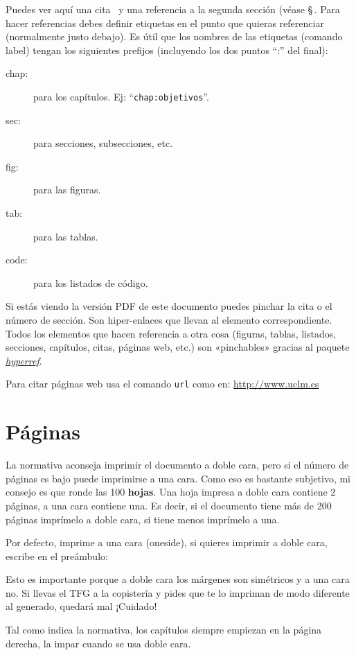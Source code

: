 Puedes ver aquí una cita~\cite{design_patterns} y una referencia a la segunda sección
(véase \S\,. Para hacer referencias debes definir etiquetas en el punto
que quieras referenciar (normalmente justo debajo). Es útil que los nombres de las
etiquetas (comando label) tengan los siguientes prefijos (incluyendo los dos puntos ``:''
del final):

\begin{description}
\item[chap:] para los capítulos. Ej: ``\texttt{chap:objetivos}''.
\item[sec:] para secciones, subsecciones, etc.
\item[fig:] para las figuras.
\item[tab:] para las tablas.
\item[code:] para los listados de código.
\end{description}

Si estás viendo la versión PDF de este documento puedes pinchar la cita o el número de
sección. Son hiper-enlaces que llevan al elemento correspondiente. Todos los elementos que
hacen referencia a otra cosa (figuras, tablas, listados, secciones, capítulos, citas,
páginas web, etc.) son «pinchables» gracias al paquete
\href{http://latex.tugraz.at/_media/docs/hyperref.pdf}{\emph{hyperref}}.

Para citar páginas web usa el comando \texttt{url} como en: \url{http://www.uclm.es}


\section{Páginas}
\label{sec:paginas}

La normativa aconseja imprimir el documento a doble cara, pero si el número de
páginas es bajo puede imprimirse a una cara. Como eso es bastante subjetivo, mi
consejo es que ronde las 100 \textbf{hojas}. Una hoja impresa a doble cara
contiene 2 páginas, a una cara contiene una. Es decir, si el documento tiene más
de 200 páginas imprímelo a doble cara, si tiene menos imprímelo a una.

Por defecto, \esitfg{} imprime a una cara (oneside), si quieres imprimir a doble cara,
escribe en el preámbulo:


Esto es importante porque a doble cara los márgenes son simétricos y a una cara
no. Si llevas el TFG a la copistería y pides que te lo impriman de modo
diferente al generado, quedará mal ¡Cuidado!

Tal como indica la normativa, los capítulos siempre empiezan en la página
derecha, la impar cuando se usa doble cara.



